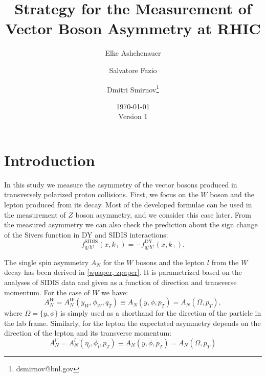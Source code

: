 \documentclass[12pt]{article}
\begin{document}
\setcounter{section}{0}
\setcounter{subsection}{0}
\setcounter{equation}{0}
\setcounter{figure}{0}
\setcounter{footnote}{0}
\setcounter{table}{0}


\title{Strategy for the Measurement of Vector Boson Asymmetry at RHIC}

\author{Elke Ashchenauer}
\author{Salvatore Fazio}
\author{Dmitri Smirnov\thanks{dsmirnov@bnl.gov}}


\date{\today\\[1em]Version 1}

\maketitle



\section{Introduction}

In this study we measure the asymmetry of the vector bosons produced in
transversely polarized proton collisions. First, we focus on the $W$ boson and
the lepton produced from its decay. Most of the developed formulae can be used
in the measurement of $Z$ boson asymmetry, and we consider this case later.
From the measured asymmetry we can also check the prediction about the sign
change of the Sivers function in DY and SIDIS interactions:
%
\begin{equation}
f^\text{SIDIS}_{q/h^\uparrow} (x, k_\perp) = - f^\text{DY}_{q/h^\uparrow} (x, k_\perp).
\end{equation}

The single spin asymmetry $A_N$ for the $W$ bosons and the lepton $l$ from the
$W$ decay has been derived in \ref{wpaper, zpaper}. It is parametrized based on
the analyses of SIDIS data and given as a function of direction and transverse
momentum. For the case of $W$ we have:
%
\begin{equation}
A^W_N = A^W_N(y_W, \phi_W, q_T) \equiv A_N(y, \phi, p_T) = A_N(\Omega, p_T),
\label{eq:asym_wboson}
\end{equation}
%
where $\Omega = \{y, \phi\}$ is simply used as a shorthand for the direction of
the particle in the lab frame. Similarly, for the lepton the expectated
asymmetry depends on the direction of the lepton and its transverse momentum:
%
\begin{equation}
A^l_N = A^l_N(\eta_l, \phi_l, p_T) \equiv A_N(y, \phi, p_T) = A_N(\Omega, p_T)
\label{eq:asym_lepton}
\end{equation}
\end{document}
